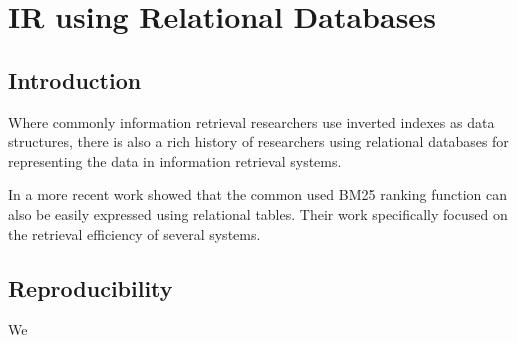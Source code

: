 \chapter{IR using Relational Databases}
\section{Introduction}
Where commonly information retrieval researchers use inverted indexes as data structures, there is also a rich history of researchers using relational databases for representing the data in information retrieval systems. 


In a more recent work \cite{OldDog} showed that the common used BM25 ranking function can also be easily expressed using relational tables. Their work specifically focused on the retrieval efficiency of several systems.   

\section{Reproducibility}

We \cite{Kamphuis2020BM25}